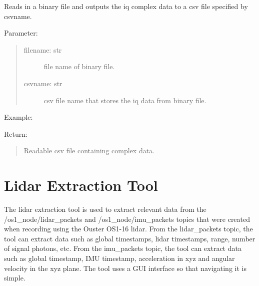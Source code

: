 \documentclass[letterpaper,10pt,english]{sphinxmanual}
\begin{document}
\begin{fulllineitems}
\label{\detokenize{TI radar:TI_parser.readTIdata}}
Reads in a binary file and outputs the iq complex data to a csv file specified by csvname.

Parameter:
\begin{quote}
\begin{description}
\item[{filename: str}] \leavevmode
file name of binary file.

\item[{csvname: str}] \leavevmode
csv file name that stores the iq data from binary file.

\end{description}
\end{quote}

Example:

\begin{sphinxVerbatim}[commandchars=\\\{\}]
\end{sphinxVerbatim}

Return:
\begin{quote}

Readable csv file containing complex data.
\end{quote}

\end{fulllineitems}



\section{Lidar Extraction Tool}
\label{\detokenize{Lidar extraction tool:lidar-extraction-tool}}\label{\detokenize{Lidar extraction tool::doc}}
The lidar extraction tool is used to extract relevant data from the /os1\_node/lidar\_packets and /os1\_node/imu\_packets topics that were created when recording using the Ouster OS1-16 lidar.
From the lidar\_packets topic, the tool can extract data such as global timestamps, lidar timestamps, range, number of signal photons, etc. From the imu\_packets topic,  the tool can extract
data such as global timestamp, IMU timestamp, acceleration in xyz and angular velocity in the xyz plane. The tool uses a GUI interface so that navigating it is simple.
\end{document}
